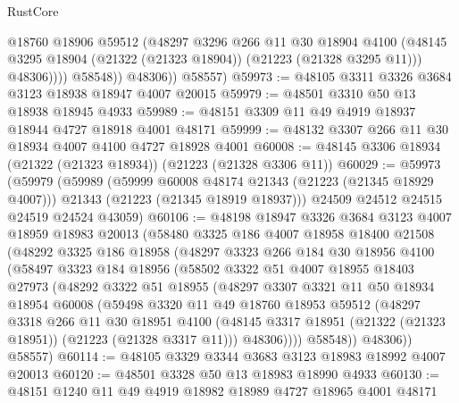 \begin{lexlean}{RustCore}
\begin{coremodule}
                    @18760
                    @18906
                    @59512
                    (@48297
                      @3296
                      @266
                      @11
                      @30
                      @18904
                      @4100
                      (@48145 @3295 @18904 (@21322 (@21323 @18904)) (@21223 (@21328 @3295 @11)))
                      @48306))))
              @58548))
          @48306))
      @58557)
@59973 := @48105 @3311 @3326 @3684 @3123 @18938 @18947 @4007 @20015
@59979 := @48501 @3310 @50 @13 @18938 @18945 @4933
@59989 := @48151 @3309 @11 @49 @4919 @18937 @18944 @4727 @18918 @4001 @48171
@59999 := @48132 @3307 @266 @11 @30 @18934 @4007 @4100 @4727 @18928 @4001
@60008 := @48145 @3306 @18934 (@21322 (@21323 @18934)) (@21223 (@21328 @3306 @11))
@60029 := @59973
    (@59979
      (@59989
        (@59999 @60008 @48174 @21343 (@21223 (@21345 @18929 @4007)))
        @21343
        (@21223 (@21345 @18919 @18937)))
      @24509
      @24512
      @24515
      @24519
      @24524
      @43059)
@60106 := @48198
    @18947
    @3326
    @3684
    @3123
    @4007
    @18959
    @18983
    @20013
    (@58480
      @3325
      @186
      @4007
      @18958
      @18400
      @21508
      (@48292
        @3325
        @186
        @18958
        (@48297
          @3323
          @266
          @184
          @30
          @18956
          @4100
          (@58497
            @3323
            @184
            @18956
            (@58502
              @3322
              @51
              @4007
              @18955
              @18403
              @27973
              (@48292
                @3322
                @51
                @18955
                (@48297
                  @3307
                  @3321
                  @11
                  @50
                  @18934
                  @18954
                  @60008
                  (@59498
                    @3320
                    @11
                    @49
                    @18760
                    @18953
                    @59512
                    (@48297
                      @3318
                      @266
                      @11
                      @30
                      @18951
                      @4100
                      (@48145 @3317 @18951 (@21322 (@21323 @18951)) (@21223 (@21328 @3317 @11)))
                      @48306))))
              @58548))
          @48306))
      @58557)
@60114 := @48105 @3329 @3344 @3683 @3123 @18983 @18992 @4007 @20013
@60120 := @48501 @3328 @50 @13 @18983 @18990 @4933
@60130 := @48151 @1240 @11 @49 @4919 @18982 @18989 @4727 @18965 @4001 @48171

\end{coremodule}
\end{lexlean}
